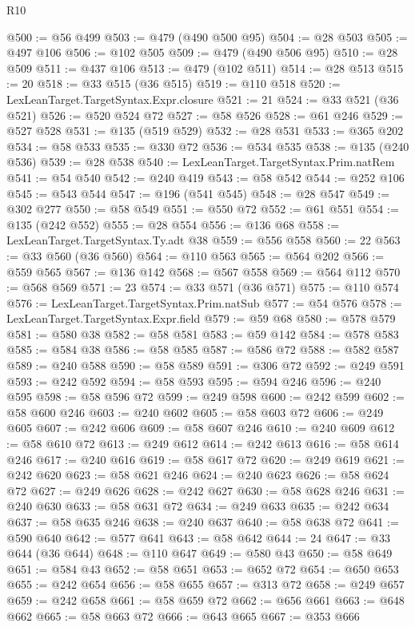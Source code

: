 \begin{lexlean}{R10}
\begin{coremodule}
@500 := @56 @499
@503 := @479 (@490 @500 @95)
@504 := @28 @503
@505 := @497 @106
@506 := @102 @505
@509 := @479 (@490 @506 @95)
@510 := @28 @509
@511 := @437 @106
@513 := @479 (@102 @511)
@514 := @28 @513
@515 := 20
@518 := @33 @515 (@36 @515)
@519 := @110 @518
@520 := LexLeanTarget.TargetSyntax.Expr.closure
@521 := 21
@524 := @33 @521 (@36 @521)
@526 := @520 @524 @72
@527 := @58 @526
@528 := @61 @246
@529 := @527 @528
@531 := @135 (@519 @529)
@532 := @28 @531
@533 := @365 @202
@534 := @58 @533
@535 := @330 @72
@536 := @534 @535
@538 := @135 (@240 @536)
@539 := @28 @538
@540 := LexLeanTarget.TargetSyntax.Prim.natRem
@541 := @54 @540
@542 := @240 @419
@543 := @58 @542
@544 := @252 @106
@545 := @543 @544
@547 := @196 (@541 @545)
@548 := @28 @547
@549 := @302 @277
@550 := @58 @549
@551 := @550 @72
@552 := @61 @551
@554 := @135 (@242 @552)
@555 := @28 @554
@556 := @136 @68
@558 := LexLeanTarget.TargetSyntax.Ty.adt @38
@559 := @556 @558
@560 := 22
@563 := @33 @560 (@36 @560)
@564 := @110 @563
@565 := @564 @202
@566 := @559 @565
@567 := @136 @142
@568 := @567 @558
@569 := @564 @112
@570 := @568 @569
@571 := 23
@574 := @33 @571 (@36 @571)
@575 := @110 @574
@576 := LexLeanTarget.TargetSyntax.Prim.natSub
@577 := @54 @576
@578 := LexLeanTarget.TargetSyntax.Expr.field
@579 := @59 @68
@580 := @578 @579
@581 := @580 @38
@582 := @58 @581
@583 := @59 @142
@584 := @578 @583
@585 := @584 @38
@586 := @58 @585
@587 := @586 @72
@588 := @582 @587
@589 := @240 @588
@590 := @58 @589
@591 := @306 @72
@592 := @249 @591
@593 := @242 @592
@594 := @58 @593
@595 := @594 @246
@596 := @240 @595
@598 := @58 @596 @72
@599 := @249 @598
@600 := @242 @599
@602 := @58 @600 @246
@603 := @240 @602
@605 := @58 @603 @72
@606 := @249 @605
@607 := @242 @606
@609 := @58 @607 @246
@610 := @240 @609
@612 := @58 @610 @72
@613 := @249 @612
@614 := @242 @613
@616 := @58 @614 @246
@617 := @240 @616
@619 := @58 @617 @72
@620 := @249 @619
@621 := @242 @620
@623 := @58 @621 @246
@624 := @240 @623
@626 := @58 @624 @72
@627 := @249 @626
@628 := @242 @627
@630 := @58 @628 @246
@631 := @240 @630
@633 := @58 @631 @72
@634 := @249 @633
@635 := @242 @634
@637 := @58 @635 @246
@638 := @240 @637
@640 := @58 @638 @72
@641 := @590 @640
@642 := @577 @641
@643 := @58 @642
@644 := 24
@647 := @33 @644 (@36 @644)
@648 := @110 @647
@649 := @580 @43
@650 := @58 @649
@651 := @584 @43
@652 := @58 @651
@653 := @652 @72
@654 := @650 @653
@655 := @242 @654
@656 := @58 @655
@657 := @313 @72
@658 := @249 @657
@659 := @242 @658
@661 := @58 @659 @72
@662 := @656 @661
@663 := @648 @662
@665 := @58 @663 @72
@666 := @643 @665
@667 := @353 @666

\end{coremodule}
\end{lexlean}
